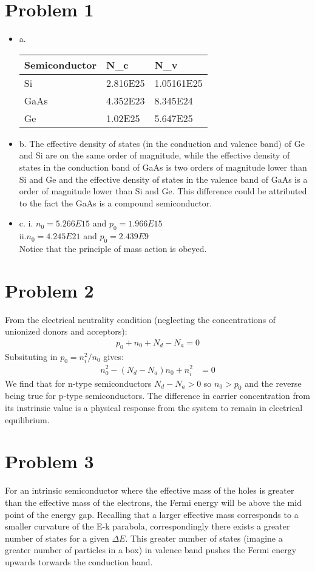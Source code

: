 \documentclass{article}
\numberwithin{equation}{section}
\begin{document}
\section*{Problem 1}
\begin{itemize}
\item a.
\begin{table}[h]
\begin{center}
\begin{tabular}{|l |l |l|} 
  \hline
 Semiconductor & N_c &N_v \\
  \hline
  Si & 2.816E25 & 1.05161E25 \\ \hline
  GaAs & 4.352E23 &8.345E24\\ \hline
  Ge & 1.02E25 &5.647E25\\ \hline 
\end{tabular}
\end{center}
\end{table}
\item b. The effective density of states (in the conduction and valence band) of Ge and Si are on the same order of magnitude, while the effective density of states in the conduction band of GaAs is two orders of magnitude lower than Si and Ge and  the effective density of states in the valence band of GaAs is a order of magnitude lower than Si and Ge. This difference could be attributed to the fact the GaAs is a compound semiconductor.
\item c. 
i. $n_0=5.266E15$ and $p_0=1.966E15$\\ 
ii.$n_0=4.245E21$ and $p_0=2.439E9$ \\
Notice that the principle of mass action is obeyed.
\end{itemize}

\section*{Problem 2}
From the electrical neutrality condition (neglecting the concentrations of unionized donors and acceptors):
\begin{align*}
p_0+n_0+N_d-N_a=0
\end{align*}
Subsituting in $p_0=n_i^2/n_0$ gives:
\begin{align*}
n_0^2-(N_d-N_a)n_0+n_i^2&=0
\end{align*}
We find that for n-type semiconductors $N_d-N_a>0$ so $n_0>p_0$ and the reverse being true for p-type semiconductors. The difference in carrier concentration from its instrinsic value is a physical response from the system to remain in electrical equilibrium.
\section*{Problem 3} For an intrinsic semiconductor where the effective mass of the holes is greater than the effective mass of the electrons, the Fermi energy will be above the mid point of the energy gap. Recalling that a larger effective mass corresponds to a smaller curvature of the E-k parabola, correspondingly there exists a greater number of states for a given $\Delta E$. This greater number of states (imagine a greater number of particles in a box) in valence band pushes the Fermi energy upwards torwards the conduction band.  
\end{document}
